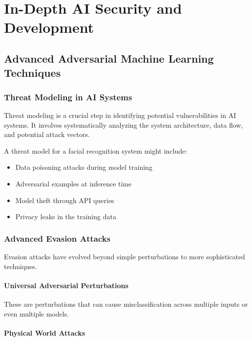\documentclass[
]{article}
\author{}
\date{}
\begin{document}
\chapter{In-Depth AI Security and Development}

\section{Advanced Adversarial Machine Learning Techniques}

\subsection{Threat Modeling in AI Systems}

Threat modeling is a crucial step in identifying potential
vulnerabilities in AI systems. It involves systematically analyzing the
system architecture, data flow, and potential attack vectors.

\begin{example}
A threat model for a facial recognition system might include:
\begin{itemize}
    \item Data poisoning attacks during model training
    \item Adversarial examples at inference time
    \item Model theft through API queries
    \item Privacy leaks in the training data
\end{itemize}
\end{example}

\subsection{Advanced Evasion Attacks}

Evasion attacks have evolved beyond simple perturbations to more
sophisticated techniques.

\subsubsection{Universal Adversarial Perturbations}

These are perturbations that can cause misclassification across multiple
inputs or even multiple models.

\subsubsection{Physical World Attacks}
\end{document}
